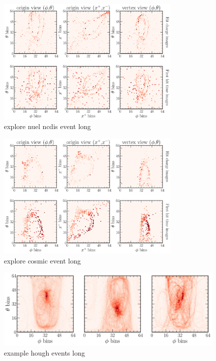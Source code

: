 \begin{figure} %
    \includegraphics[width=0.8\textwidth]{diagrams/7-cvn/chipsnet/explore_nuel_ncdis_event.pdf}
    \caption[explore nuel ncdis event short]
    {explore nuel ncdis event long}
    \label{fig:explore_nuel_ncdis_event}
\end{figure}

\begin{figure} %
    \includegraphics[width=0.8\textwidth]{diagrams/7-cvn/chipsnet/explore_cosmic_event.pdf}
    \caption[explore cosmic event short]
    {explore cosmic event long}
    \label{fig:explore_cosmic_event}
\end{figure}

\begin{figure} %
    \includegraphics[width=\textwidth]{diagrams/7-cvn/chipsnet/explore_hough_events.pdf}
    \caption[example hough events short]
    {example hough events long}
    \label{fig:example_hough_events}
\end{figure}

